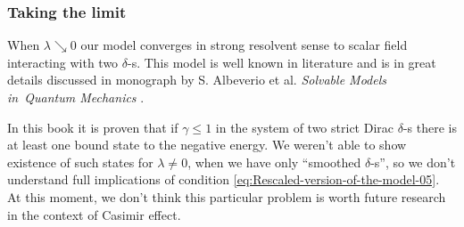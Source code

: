 \documentclass[10pt,t]{beamer}
\begin{document}
\begin{frame}
  \frametitle{Taking the limit}


  When $\lambda \searrow 0$ our model converges in strong resolvent sense to scalar
  field interacting with two $\delta$-s. This model is well known in literature
  and is in great details discussed in monograph by S. Albeverio et al.
  \textit{Solvable Models in~Quantum Mechanics}
  \parencite{Albeverio-et-al-Solvable-Models-in-Quantum-Mechanics-Pub-1988}.

  In this book it is proven that if $\gamma \leq 1$ in the system of two strict
  Dirac $\delta$-s there \alert{is} at least one bound state to the negative
  energy. We weren't able to show existence of such states for $\lambda \neq 0$,
  when we have only ``smoothed $\delta$-s'', so we don't understand full
  implications of condition \eqref{eq:Rescaled-version-of-the-model-05}.
  At this moment, we don't think this particular problem is worth future
  research in the context of Casimir effect.

\end{frame}
\end{document}

